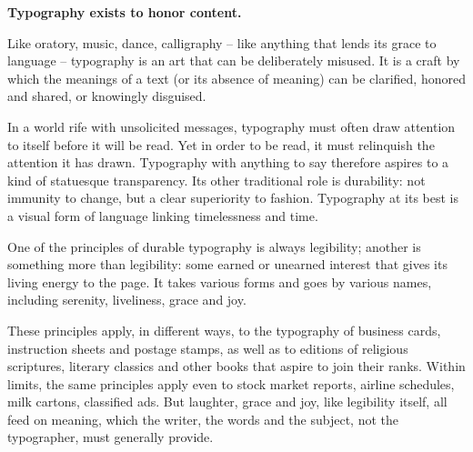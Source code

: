 ﻿%

\label{cha:engorg}

\textbf{Typography exists to honor content.}

Like oratory, music, dance, calligraphy -- like anything that lends its grace to language -- typography is an art that can be deliberately misused. It is a craft by which the meanings of a text (or its absence of meaning) can be clarified, honored and shared, or knowingly disguised.

In a world rife with unsolicited messages, typography must often draw attention to itself before it will be read. Yet in order to be read, it must relinquish the attention it has drawn. Typography with anything to say therefore aspires to a kind of statuesque transparency. Its other traditional role is durability: not immunity to change, but a clear superiority to fashion. Typography at its best is a visual form of language linking timelessness and time.

One of the principles of durable typography is always legibility; another is something more than legibility: some earned or unearned interest that gives its living energy to the page. It takes various forms and goes by various names, including serenity, liveliness, grace and joy.

These principles apply, in different ways, to the typography of business cards, instruction sheets and postage stamps, as well as to editions of religious scriptures, literary classics and other books that aspire to join their ranks. Within limits, the same principles apply even to stock market reports, airline schedules, milk cartons, classified ads. But laughter, grace and joy, like legibility itself, all feed on meaning, which the writer, the words and the subject, not the typographer, must generally provide.

